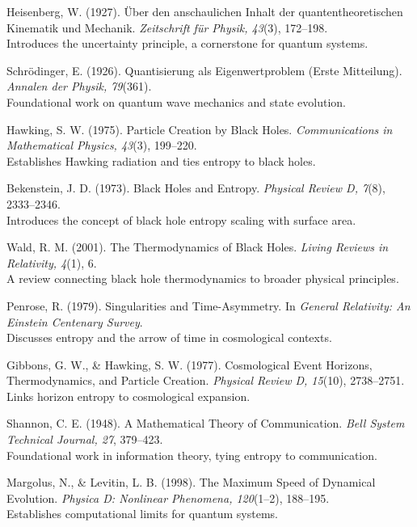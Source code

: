\documentclass[12pt]{article}
\begin{document}
\begin{thebibliography}{99}

Heisenberg, W. (1927). Über den anschaulichen Inhalt der quantentheoretischen Kinematik und Mechanik. \textit{Zeitschrift für Physik, 43}(3), 172–198. \\
Introduces the uncertainty principle, a cornerstone for quantum systems.

Schrödinger, E. (1926). Quantisierung als Eigenwertproblem (Erste Mitteilung). \textit{Annalen der Physik, 79}(361). \\
Foundational work on quantum wave mechanics and state evolution.

Hawking, S. W. (1975). Particle Creation by Black Holes. \textit{Communications in Mathematical Physics, 43}(3), 199–220. \\
Establishes Hawking radiation and ties entropy to black holes.

Bekenstein, J. D. (1973). Black Holes and Entropy. \textit{Physical Review D, 7}(8), 2333–2346. \\
Introduces the concept of black hole entropy scaling with surface area.

Wald, R. M. (2001). The Thermodynamics of Black Holes. \textit{Living Reviews in Relativity, 4}(1), 6. \\
A review connecting black hole thermodynamics to broader physical principles.

Penrose, R. (1979). Singularities and Time-Asymmetry. In \textit{General Relativity: An Einstein Centenary Survey}. \\
Discusses entropy and the arrow of time in cosmological contexts.

Gibbons, G. W., \& Hawking, S. W. (1977). Cosmological Event Horizons, Thermodynamics, and Particle Creation. \textit{Physical Review D, 15}(10), 2738–2751. \\
Links horizon entropy to cosmological expansion.

Shannon, C. E. (1948). A Mathematical Theory of Communication. \textit{Bell System Technical Journal, 27}, 379–423. \\
Foundational work in information theory, tying entropy to communication.

Margolus, N., \& Levitin, L. B. (1998). The Maximum Speed of Dynamical Evolution. \textit{Physica D: Nonlinear Phenomena, 120}(1–2), 188–195. \\
Establishes computational limits for quantum systems.


\end{thebibliography}
\end{document}
